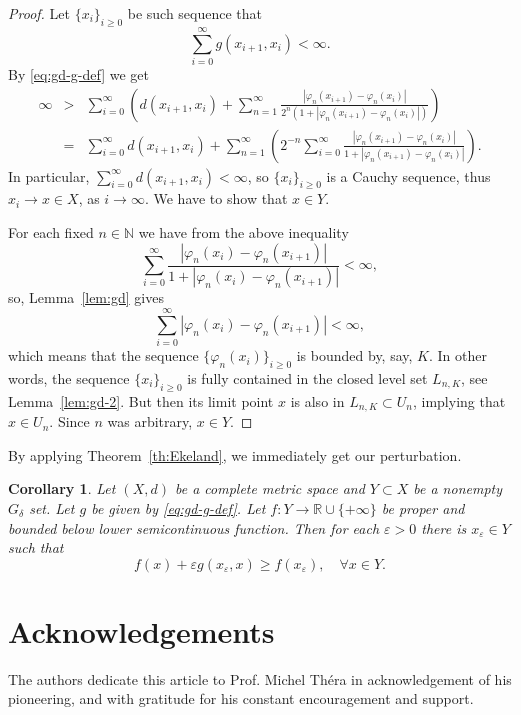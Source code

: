 \documentclass[12pt]{article}
\newtheorem{corollary}[theorem]{Corollary}
\begin{document}
    \begin{proof}
        Let $\{x_i\}_{i\ge0}$ be such sequence that
        $$
            \sum_{i=0}^\infty g(x_{i+1},x_i) < \infty.
        $$
        By \eqref{eq:gd-g-def} we get
        \begin{eqnarray*}
            \infty &>& \sum_{i=0}^\infty \left(d(x_{i+1},x_i) + \sum_{n=1}^\infty \frac{|\varphi_n(x_{i+1})-\varphi_n(x_i)|}{2^n(1+|\varphi_n(x_{i+1})-\varphi_n(x_i)|)}\right)\\
            &=& \sum_{i=0}^\infty d(x_{i+1},x_i) + \sum_{n=1}^\infty\left(2^{-n}\sum_{i=0}^\infty\frac{|\varphi_n(x_{i+1})-\varphi_n(x_i)|}{1+|\varphi_n(x_{i+1})-\varphi_n(x_i)|}\right).
        \end{eqnarray*}
        In particular, $\sum_{i=0}^\infty d(x_{i+1},x_i) < \infty$, so $\{x_i\}_{i\ge0}$ is a Cauchy sequence, thus $x_i\to x\in X$, as $i\to\infty$. We have to show that $x\in Y$.

        For each fixed $n\in\mathbb{N}$ we have from the above inequality
        $$
            \sum_{i=0}^\infty \frac{|\varphi_n(x_i)-\varphi_n(x_{i+1})|}{1+|\varphi_n(x_i)-\varphi_n(x_{i+1})|} < \infty,
        $$
        so, Lemma~\ref{lem:gd} gives
        $$
            \sum_{i=0}^\infty |\varphi_n(x_i)-\varphi_n(x_{i+1})| < \infty,
        $$
        which means that the sequence $\{\varphi_n(x_i)\}_{i\ge0}$ is bounded by, say, $K$. In other words, the sequence $\{x_i\}_{i\ge0}$ is fully contained in the closed level set $L_{n,K}$, see Lemma~\ref{lem:gd-2}. But then its limit point $x$ is also in $L_{n,K}\subset U_n$, implying that $x\in U_n$. Since $n$ was arbitrary, $x\in Y$.
    \end{proof}
    By applying Theorem~\ref{th:Ekeland}, we immediately get our perturbation.
    \begin{corollary}
        \label{cor:gd}
   Let $(X,d)$ be a complete metric space and $Y\subset X$ be a nonempty $G_\delta$ set. Let $g$ be given by \eqref{eq:gd-g-def}.     Let  $f:Y\to\mathbb{R}\cup\{+\infty\}$ be proper and bounded below lower semicontinuous function. Then for each $\varepsilon > 0$ there is $x_\varepsilon\in Y$ such that
        $$
            f(x) + \varepsilon g(x_\varepsilon, x) \ge f(x_\varepsilon),\quad\forall x\in Y.
        $$
    \end{corollary}

\section*{Acknowledgements}
The authors dedicate this article to Prof. Michel Th\'era in acknowledgement of his pioneering, and with gratitude for his constant encouragement and support.
\end{document}
